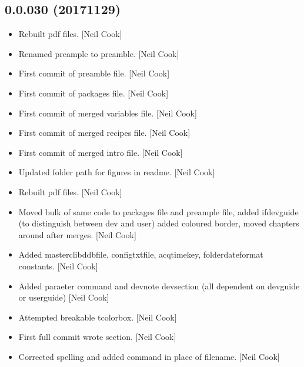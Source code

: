 \documentclass[a4paper,10pt,english]{report}
\begin{document}
\subsection{0.0.030 (2017\sphinxhyphen{}11\sphinxhyphen{}29)}
\label{\detokenize{misc/changelog:id541}}\begin{itemize}
\item {} 
Rebuilt pdf files. {[}Neil Cook{]}

\item {} 
Renamed preample to preamble. {[}Neil Cook{]}

\item {} 
First commit of preamble file. {[}Neil Cook{]}

\item {} 
First commit of packages file. {[}Neil Cook{]}

\item {} 
First commit of merged variables file. {[}Neil Cook{]}

\item {} 
First commit of merged recipes file. {[}Neil Cook{]}

\item {} 
First commit of merged intro file. {[}Neil Cook{]}

\item {} 
Updated folder path for figures in readme. {[}Neil Cook{]}

\item {} 
Rebuilt pdf files. {[}Neil Cook{]}

\item {} 
Moved bulk of same code to packages file and preample file, added
ifdevguide (to distinguish between dev and user) added coloured
border, moved chapters around after merges. {[}Neil Cook{]}

\item {} 
Added masterclibddbfile, configtxtfile, acqtimekey, folderdateformat
constants. {[}Neil Cook{]}

\item {} 
Added paraeter command and devnote devsection (all dependent on
devguide or userguide) {[}Neil Cook{]}

\item {} 
Attempted breakable tcolorbox. {[}Neil Cook{]}

\item {} 
First full commit \sphinxhyphen{} wrote section. {[}Neil Cook{]}

\item {} 
Corrected spelling and added command in place of filename. {[}Neil Cook{]}


\end{itemize}
\end{document}
